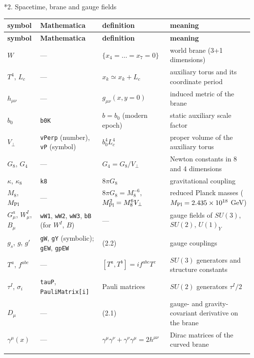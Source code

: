 \documentclass[10pt,a4paper]{article}
\makeatletter
\renewcommand\section{\@startsection{section}{1}{\z@}{-3.5ex \@plus -1ex \@minus -.2ex}{2.3ex \@plus.2ex}{\normalfont\Large\bfseries\raggedright}}
\makeatother
\begin{document}
\section*{2. Spacetime, brane and gauge fields}
{\small
\begin{longtable}{>{\raggedright\arraybackslash}p{}>{\raggedright\arraybackslash}p{}>{\raggedright\arraybackslash}p{}>{\raggedright\arraybackslash}p{}}
\toprule
\textbf{symbol} & \textbf{Mathematica} & \textbf{definition} & \textbf{meaning} \\
\midrule\endfirsthead
\toprule
\textbf{symbol} & \textbf{Mathematica} & \textbf{definition} & \textbf{meaning} \\
\midrule\endhead
\endfoot
\bottomrule\endlastfoot
$W$ & — & $\lbrace x_4=\dots=x_7=0\rbrace$ & world brane (3+1 dimensions) \\
$T^4$, $L_c$ & — & $x_k\simeq x_k+L_c$ & auxiliary torus and its coordinate period \\
$h_{\mu\nu}$ & — & $g_{\mu\nu}(x,y=0)$ & induced metric of the brane \\
$b_0$ & \texttt{b0K} & $b=b_0$ (modern epoch) & static auxiliary scale factor \\
$V_\perp$ & \texttt{vPerp} (number), \texttt{vP} (symbol) & $b_0^4L_c^4$ & proper volume of the auxiliary torus \\
$G_8$, $G_4$ & — & $G_4=G_8/V_\perp$ & Newton constants in 8 and 4 dimensions \\
$\kappa$, $\kappa_8$ & \texttt{k8} & $8\pi G_8$ & gravitational coupling \\
$M_8$, $M_{\rm Pl}$ & — & $8\pi G_8=M_8^{-6}$, $M_{\rm Pl}^2=M_8^6V_\perp$ & reduced Planck masses ($M_{\rm Pl}=2.435\times10^{18}$ GeV) \\
$G^a_\mu$, $W^I_\mu$, $B_\mu$ & \texttt{wW1}, \texttt{wW2}, \texttt{wW3}, \texttt{bB} (for $W^I$, $B$) & — & gauge fields of $SU(3)$, $SU(2)$, $U(1)_Y$ \\
$g_s$, $g$, $g'$ & \texttt{gW}, \texttt{gY} (symbolic); \texttt{gEW}, \texttt{gpEW} & (2.2) & gauge couplings \\
$T^a$, $f^{abc}$ & — & $[T^a,T^b]=if^{abc}T^c$ & $SU(3)$ generators and structure constants \\
$\tau^I$, $\sigma_i$ & \texttt{tauP}, \texttt{PauliMatrix[i]} & Pauli matrices & $SU(2)$ generators $\tau^I/2$ \\
$D_\mu$ & — & (2.1) & gauge- and gravity-covariant derivative on the brane \\
$\gamma^\mu(x)$ & — & $\gamma^\mu\gamma^\nu+\gamma^\nu\gamma^\mu=2h^{\mu\nu}$ & Dirac matrices of the curved brane \\*
\end{longtable}}
\end{document}
